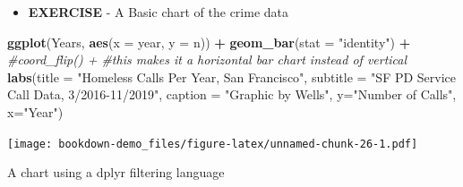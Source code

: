 \documentclass[]{book}
\newenvironment{Shaded}{\begin{snugshade}}{\end{snugshade}}
\newcommand{\CommentTok}[1]{\textcolor[rgb]{0.56,0.35,0.01}{\textit{#1}}}
\newcommand{\DataTypeTok}[1]{\textcolor[rgb]{0.13,0.29,0.53}{#1}}
\newcommand{\DecValTok}[1]{\textcolor[rgb]{0.00,0.00,0.81}{#1}}
\newcommand{\KeywordTok}[1]{\textcolor[rgb]{0.13,0.29,0.53}{\textbf{#1}}}
\newcommand{\NormalTok}[1]{#1}
\newcommand{\OperatorTok}[1]{\textcolor[rgb]{0.81,0.36,0.00}{\textbf{#1}}}
\newcommand{\StringTok}[1]{\textcolor[rgb]{0.31,0.60,0.02}{#1}}
\providecommand{\tightlist}{%
  \setlength{\itemsep}{0pt}\setlength{\parskip}{0pt}}
\begin{document}
\begin{itemize}
\tightlist
\item
  \textbf{EXERCISE} - A Basic chart of the crime data
\end{itemize}

\begin{Shaded}
\begin{Highlighting}[]
\KeywordTok{ggplot}\NormalTok{(Years, }\KeywordTok{aes}\NormalTok{(}\DataTypeTok{x =}\NormalTok{ year, }\DataTypeTok{y =}\NormalTok{ n)) }\OperatorTok{+}\StringTok{ }
\StringTok{  }\KeywordTok{geom_bar}\NormalTok{(}\DataTypeTok{stat =} \StringTok{"identity"}\NormalTok{) }\OperatorTok{+}
\StringTok{  }\CommentTok{#coord_flip() +    #this makes it a horizontal bar chart instead of vertical}
\StringTok{  }\KeywordTok{labs}\NormalTok{(}\DataTypeTok{title =} \StringTok{"Homeless Calls Per Year, San Francisco"}\NormalTok{, }
       \DataTypeTok{subtitle =} \StringTok{"SF PD Service Call Data, 3/2016-11/2019"}\NormalTok{,}
       \DataTypeTok{caption =} \StringTok{"Graphic by Wells"}\NormalTok{,}
       \DataTypeTok{y=}\StringTok{"Number of Calls"}\NormalTok{,}
       \DataTypeTok{x=}\StringTok{"Year"}\NormalTok{)}
\end{Highlighting}
\end{Shaded}

\texttt{[image: bookdown-demo\_files/figure-latex/unnamed-chunk-26-1.pdf]}

A chart using a dplyr filtering language

\begin{Shaded}
\end{Shaded}
\end{document}
